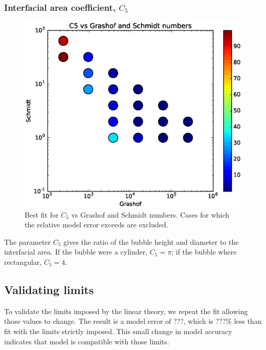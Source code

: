 \subsubsection{Interfacial area coefficient, $C_5$}
\begin{figure}
\includegraphics[width=\columnwidth]{figs/C5-vs-Grashof-Schmidt}
\caption{ 
  Best fit for $C_5$ vs Grashof and Schmidt numbers.
  Cases for which the relative model error exceeds \fittol are excluded.
}
\end{figure}



The parameter $C_5$ gives the ratio of the bubble height and diameter to the interfacial area.
If the bubble were a cylinder, $C_5 = \pi$; if the bubble where rectangular, $C_5 = 4$.


\subsection{Validating limits}
To validate the limits imposed by the linear theory, we repeat the fit allowing those values to change.
The result is a model error of ???, which is ???\% less than fit with the limits strictly imposed.
This small change in model accuracy indicates that model is compatible with those limits.


